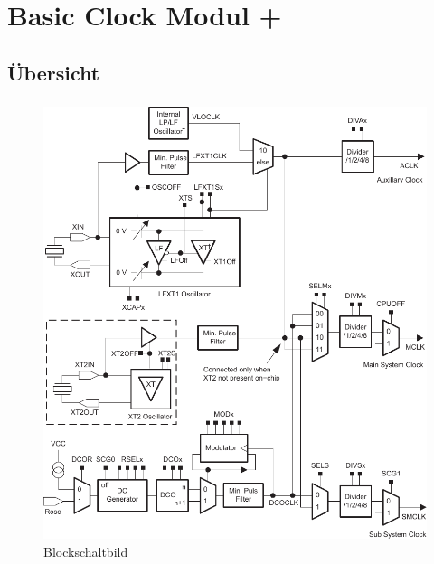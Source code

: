 
\section{Basic Clock Modul +}

\subsection{Übersicht}
\begin{frame}
    \frametitle{}
    \framesubtitle{}
      \begin{figure}
        \includegraphics[width=0.5\columnwidth]{fig/ti_fg_bcm_block.pdf}
        \caption{Blockschaltbild}
      \end{figure}

\end{frame}